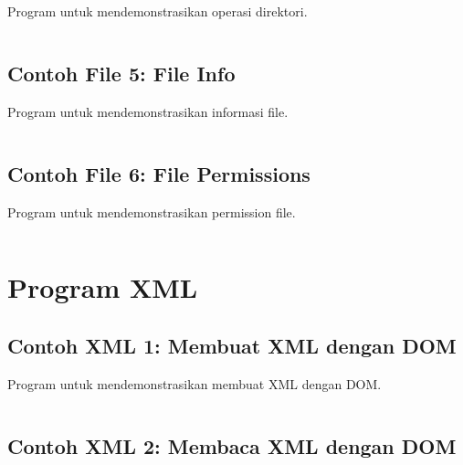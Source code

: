 Program untuk mendemonstrasikan operasi direktori.

\begin{lstlisting}[language=c++, caption=Directory Operations]

\end{lstlisting}

\subsection{Contoh File 5: File Info}

Program untuk mendemonstrasikan informasi file.

\begin{lstlisting}[language=c++, caption=File Info]

\end{lstlisting}

\subsection{Contoh File 6: File Permissions}

Program untuk mendemonstrasikan permission file.

\begin{lstlisting}[language=c++, caption=File Permissions]

\end{lstlisting}

\section{Program XML}

\subsection{Contoh XML 1: Membuat XML dengan DOM}

Program untuk mendemonstrasikan membuat XML dengan DOM.

\begin{lstlisting}[language=c++, caption=Membuat XML dengan DOM]

\end{lstlisting}

\subsection{Contoh XML 2: Membaca XML dengan DOM}

